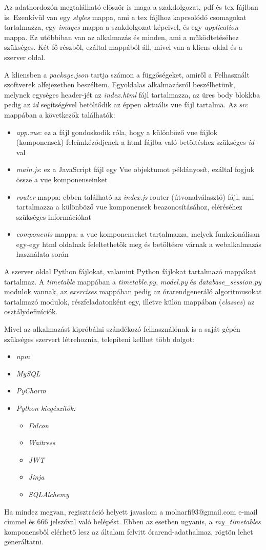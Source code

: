 \documentclass[12pt,a4paper]{report}
\begin{document}
Az adathordozón megtalálható először is maga a szakdolgozat, pdf és tex fájlban is. Ezenkívül van egy \textit{styles} mappa, ami a tex fájlhoz kapcsolódó csomagokat tartalmazza, egy \textit{images} mappa a szakdolgozat képeivel, és egy \textit{application} mappa. Ez utóbbiban van az alkalmazás és minden, ami a működtetéséhez szükséges. Két fő részből, ezáltal mappából áll, mivel van a kliens oldal és a szerver oldal.

A kliensben a \textit{package.json} tartja számon a függőségeket, amiről a Felhasznált szoftverek alfejezetben beszéltem. Egyoldalas alkalmazásról beszélhetünk, melynek egységes header-jét az \textit{index.html} fájl tartalmazza, az üres body blokkba pedig az \textit{id} segítségével betöltődik az éppen aktuális vue fájl tartalma. Az \textit{src} mappában a következők találhatók:

\begin{itemize} 
\item \textit{app.vue}: ez a fájl gondoskodik róla, hogy a különböző vue fájlok (komponensek) felcímkéződjenek a html fájlba való betöltéshez szükséges \textit{id}-val
\item \textit{main.js}: ez a JavaScript fájl egy Vue objektumot példányosít, ezáltal fogjuk össze a vue komponenseinket
\item \textit{router} mappa: ebben található az \textit{index.js} router (útvonalválasztó) fájl, ami tartalmazza a különböző vue komponensek beazonosításához, eléréséhez szükséges információkat
\item \textit{components} mappa: a vue komponenseket tartalmazza, melyek funkcionálisan egy-egy html oldalnak feleltethetők meg és betöltésre várnak a webalkalmazás használata során
\end{itemize}

A szerver oldal Python fájlokat, valamint Python fájlokat tartalmazó mappákat tartalmaz. A \textit{timetable} mappában a \textit{timetable.py}, \textit{model.py} és \textit{database\_session.py} modulok vannak, az \textit{exercises} mappában pedig az órarendgeneráló algoritmusokat tartalmazó modulok, részfeladatonként egy, illetve külön mappában (\textit{classes}) az osztálydefiníciók.

Mivel az alkalmazást kipróbálni szándékozó felhasználónak is a saját gépén szükséges szervert létrehoznia, telepíteni kellhet több dolgot:
\begin{itemize}
\item \textit{npm}
\item \textit{MySQL}
\item \textit{PyCharm}
\item \textit{Python kiegészítők:}
\begin{itemize}
	\item \textit{Falcon}
	\item \textit{Waitress}
	\item \textit{JWT}
	\item \textit{Jinja}
	\item \textit{SQLAlchemy}
\end{itemize}
\end{itemize}

Ha mindez megvan, regisztráció helyett javaslom a molnarfi93@gmail.com e-mail címmel és 666 jelszóval való belépést. Ebben az esetben ugyanis, a \textit{my\_timetables} komponensből elérhető lesz az általam felvitt órarend-adathalmaz, rögtön lehet generáltatni.
\end{document}
